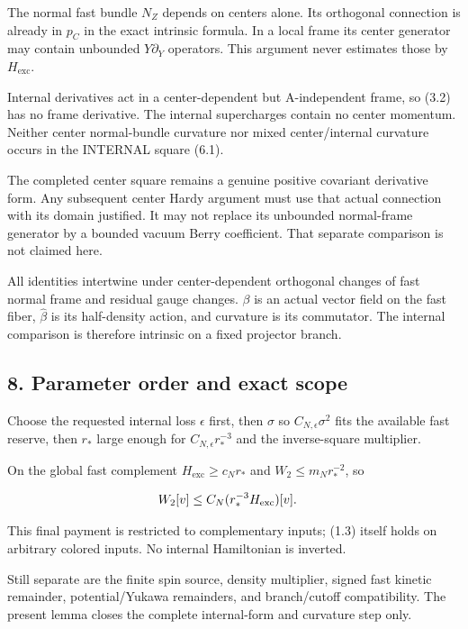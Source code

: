 The normal fast bundle \(N_{Z}\) depends on centers alone. Its
orthogonal connection is already in \(p_{C}\) in the exact intrinsic
formula. In a local frame its center generator may contain unbounded
\(Y \partial _{Y}\) operators. This argument never estimates those by
\(H_{\mathrm{exc}}\).

Internal derivatives act in a center-dependent but A-independent frame,
so (3.2) has no frame derivative. The internal supercharges contain no
center momentum. Neither center normal-bundle curvature nor mixed
center/internal curvature occurs in the INTERNAL square (6.1).

The completed center square remains a genuine positive covariant
derivative form. Any subsequent center Hardy argument must use that
actual connection with its domain justified. It may not replace its
unbounded normal-frame generator by a bounded vacuum Berry coefficient.
That separate comparison is not claimed here.

All identities intertwine under center-dependent orthogonal changes of
fast normal frame and residual gauge changes. \(\beta\) is an actual
vector field on the fast fiber, \(\widehat{\beta}\) is its half-density
action, and curvature is its commutator. The internal comparison is
therefore intrinsic on a fixed projector branch.

\subsection{8. Parameter order and exact
scope}\label{g-parameter-order-and-exact-scope}

Choose the requested internal loss \(\epsilon\) first, then \(\sigma\)
so \(C_{N,\epsilon}\sigma ^{2}\) fits the available fast reserve, then
\(r_{*}\) large enough for \(C_{N,\epsilon}r_{*}^{-3}\) and the
inverse-square multiplier.

On the global fast complement \(H_{\mathrm{exc}}\ge c_{N} r_{*}\) and
\(W_{2}\le m_{N} r_{*}^{-2}\), so

\begin{gather*}
\begin{aligned}
& W_{2}[v] \le  C_{N} (r_{*}^{-3} H_{\mathrm{exc}})[v].
\end{aligned}\notag
\end{gather*}

This final payment is restricted to complementary inputs; (1.3) itself
holds on arbitrary colored inputs. No internal Hamiltonian is inverted.

Still separate are the finite spin source, density multiplier, signed
fast kinetic remainder, potential/Yukawa remainders, and branch/cutoff
compatibility. The present lemma closes the complete internal-form and
curvature step only.
